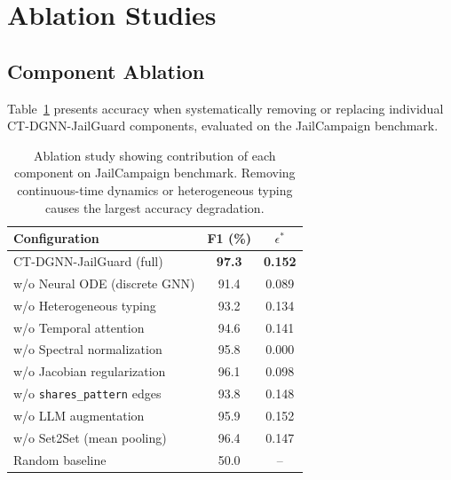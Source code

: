 \documentclass[journal]{IEEEtran}
\theoremstyle{plain}
\theoremstyle{definition}
\theoremstyle{remark}
\begin{document}
\section{Ablation Studies}
\label{sec:ablation}

\subsection{Component Ablation}

Table~\ref{tab:ablation} presents accuracy when systematically removing or replacing individual CT-DGNN-JailGuard components, evaluated on the JailCampaign benchmark.

\begin{table}[t]
\centering
\caption{Ablation study showing contribution of each component on JailCampaign benchmark. Removing continuous-time dynamics or heterogeneous typing causes the largest accuracy degradation.}
\label{tab:ablation}
\begin{tabular}{@{}lcc@{}}
\toprule
\textbf{Configuration} & \textbf{F1 (\%)} & \textbf{$\epsilon^*$} \\
\midrule
CT-DGNN-JailGuard (full) & \textbf{97.3} & \textbf{0.152} \\
\midrule
\quad w/o Neural ODE (discrete GNN) & 91.4 & 0.089 \\
\quad w/o Heterogeneous typing & 93.2 & 0.134 \\
\quad w/o Temporal attention & 94.6 & 0.141 \\
\quad w/o Spectral normalization & 95.8 & 0.000 \\
\quad w/o Jacobian regularization & 96.1 & 0.098 \\
\quad w/o \texttt{shares\_pattern} edges & 93.8 & 0.148 \\
\quad w/o LLM augmentation & 95.9 & 0.152 \\
\quad w/o Set2Set (mean pooling) & 96.4 & 0.147 \\
\midrule
Random baseline & 50.0 & -- \\
\bottomrule
\end{tabular}
\end{table}
\end{document}
